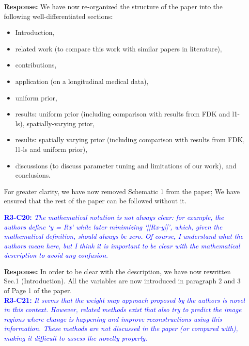 \documentclass{article}
\begin{document}
\textbf{Response:} We have now re-organized the structure of the paper into the following well-differentiated sections:
\begin{itemize}
  
\item Introduction, 
\item related work (to compare this work with similar papers in literature), 
\item contributions, 
\item application (on a longitudinal medical data), 
\item uniform prior, 
\item results: uniform prior (including comparison with results from FDK and l1-ls), 
spatially-varying prior, 
\item results: spatially varying prior (including comparison with results from FDK, l1-ls and uniform prior), 
\item discussions (to discuss parameter tuning and limitations of our work), and 
  conclusions.
  \end{itemize}
For greater clarity, we have now removed Schematic 1 from the paper; We have  ensured that the rest of the paper can be followed without it.

\textcolor{blue}{\textbf{R3-C20:}\textit{ The mathematical notation is not always clear: for example, the authors define `y = Rx' while later minimizing `||Rx-y||', which, given the mathematical definition, should always be zero. Of course, I understand what the authors mean here, but I think it is important to be clear with the mathematical description to avoid any confusion.}}


\textbf{Response:} In order to be clear with the description, we have now rewritten Sec.1 (Introduction). All the variables are now introduced in paragraph 2 and 3 of Page 1 of the paper.\\

\textcolor{blue}{\textbf{R3-C21:}\textit{ It seems that the weight map approach proposed by the authors is novel in this context. However, related methods exist that also try to predict the image regions where change is happening and improve reconstructions using this information. These methods are not discussed in the paper (or compared with), making it difficult to assess the novelty properly.}}
\end{document}
